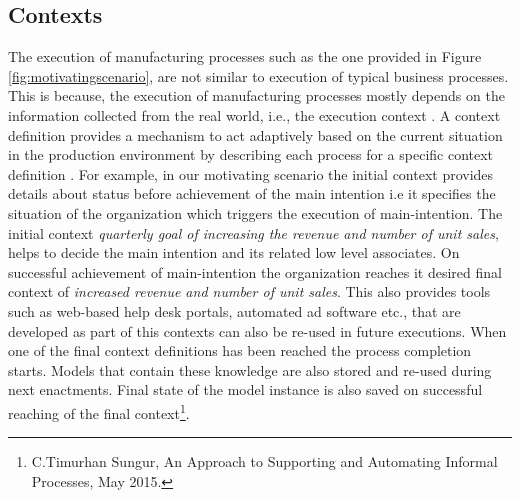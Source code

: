 \subsection{Contexts} 
\label{sec:contexts}
The execution of manufacturing processes such as the one provided in Figure \ref{fig:motivatingscenario}, are not similar to execution of typical business processes. This is because, the execution of manufacturing processes mostly depends on the information collected from the real world, i.e., the execution context \cite{Sungur2016}. A context definition provides a mechanism to act adaptively based on the current situation in the production environment by describing each process for a specific context definition \cite{Sungur2016}. For example, in our motivating scenario the initial context provides details about status before achievement of the main intention i.e it specifies the situation of the organization which triggers the execution of main-intention. The initial context \textit{quarterly goal of increasing the revenue and number of unit sales}, helps to decide the main intention and its related low level associates. On successful achievement of main-intention the organization reaches it desired final context of \textit{increased revenue and number of unit sales}. This also provides tools such as web-based help desk portals, automated ad software etc., that are developed as part of this contexts can also be re-used in future executions. When one of the final context definitions has been reached the process completion starts. Models that contain these knowledge are also stored and re-used during next enactments. Final state of the model instance is also saved on successful reaching of the final context\footnote{C.Timurhan Sungur, An Approach to Supporting and Automating Informal Processes, May 2015.}.
 
